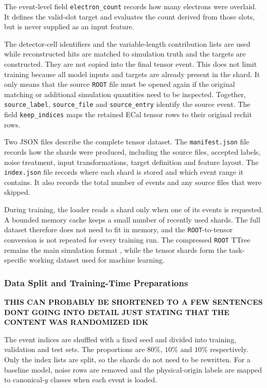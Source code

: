 The event-level field \texttt{electron\_count} records how many electrons were
overlaid. It defines the valid-slot target and evaluates the count derived
from those slots, but is never supplied as an input feature.

The detector-cell identifiers and the variable-length contribution lists are
used while reconstructed hits are matched to simulation truth and the targets
are constructed. They are not copied into the final tensor event. This does
not limit training because all model inputs and targets are already present
in the shard. It only means that the source \texttt{ROOT} file must be opened
again if the original matching or additional simulation quantities need to be
inspected. Together, \texttt{source\_label}, \texttt{source\_file} and
\texttt{source\_entry} identify the source event. The field
\texttt{keep\_indices} maps the retained ECal tensor rows to their original
\gls{rechit} rows.

Two JSON files describe the complete tensor dataset. The
\texttt{manifest.json} file records how the shards were produced, including
the source files, accepted labels, noise treatment, input transformations,
target definition and feature layout. The \texttt{index.json} file records
where each shard is stored and which event range it contains. It also records
the total number of events and any source files that were skipped.

During training, the loader reads a shard only when one of its events is
requested. A bounded memory cache keeps a small number of recently used
shards. The full dataset therefore does not need to fit in memory, and the
\texttt{ROOT}-to-tensor conversion is not repeated for every training run.
The compressed \texttt{ROOT} TTree remains the main simulation format
\cite{root_ttree}, while the tensor shards form the task-specific working
dataset used for machine learning.

\subsubsection{Data Split and Training-Time Preparations}

\textbf{THIS CAN PROBABLY BE SHORTENED TO A FEW SENTENCES DONT GOING INTO DETAIL JUST STATING THAT THE CONTENT WAS RANDOMIZED IDK}

The event indices are shuffled with a fixed seed and divided into training,
validation and test sets. The proportions are \(80\%\), \(10\%\) and \(10\%\) respectively.
Only the index lists are split, so the shards do not need to be rewritten.
For a baseline model, noise rows are removed and the physical-origin labels
are mapped to canonical-\(y\) classes when each event is loaded.

